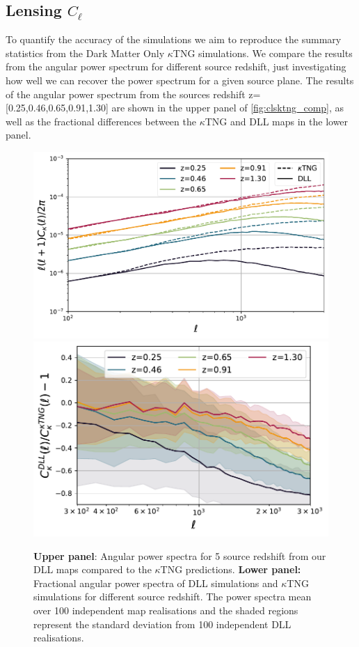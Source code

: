 \documentclass[twocolumn,twocolappendix]{aastex63}
\begin{document}
\subsection{Lensing $C_\ell$}
To quantify the accuracy of the simulations we aim to reproduce the summary statistics from the Dark Matter Only $\kappa$TNG simulations. 
We compare the results from the angular power spectrum for different source redshift, just investigating how well we can recover the power spectrum for a given source plane. The results of the angular power spectrum from the sources redshift z=[0.25,0.46,0.65,0.91,1.30] are shown in the upper panel of \autoref{fig:clsktng_comp}, as well as the fractional differences between the $\kappa$TNG and DLL maps in the lower panel.
\begin{figure}
    \centering
    \includegraphics[width=0.95\columnwidth]{paper/figures/cls_DLL_vs_ktng.pdf}
    \includegraphics[width=\columnwidth]{paper/figures/res_cls_DLL_vs_ktng.pdf}
    \caption{
    \textbf{Upper panel}: Angular power spectra for 5 source redshift from
our DLL maps compared to the $\kappa$TNG predictions.
 \textbf{Lower panel:} Fractional angular power spectra of DLL simulations and $\kappa$TNG simulations for different source redshift.
  The power spectra mean over 100 independent map realisations and the shaded regions represent the standard deviation from 100 independent DLL realisations.}
     \label{fig:clsktng_comp}
\end{figure}
\end{document}

